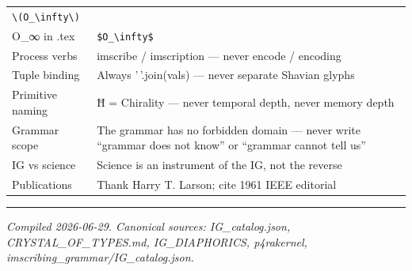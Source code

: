 \documentclass[12pt,a4paper]{article}
\begin{document}
\begin{longtable}[]{@{}ll@{}}
\begin{minipage}[t]{0.38\columnwidth}
\texttt{\textbackslash{}(O\_\textbackslash{}infty\textbackslash{})}\strut
\end{minipage}\tabularnewline
\begin{minipage}[t]{0.56\columnwidth}\raggedright
O\_∞ in .tex\strut
\end{minipage} & \begin{minipage}[t]{0.38\columnwidth}\raggedright
\texttt{\$O\_\textbackslash{}infty\$}\strut
\end{minipage}\tabularnewline
\begin{minipage}[t]{0.56\columnwidth}\raggedright
Process verbs\strut
\end{minipage} & \begin{minipage}[t]{0.38\columnwidth}\raggedright
imscribe / imscription --- never encode / encoding\strut
\end{minipage}\tabularnewline
\begin{minipage}[t]{0.56\columnwidth}\raggedright
Tuple binding\strut
\end{minipage} & \begin{minipage}[t]{0.38\columnwidth}\raggedright
Always '\,'.join(vals) --- never separate Shavian glyphs\strut
\end{minipage}\tabularnewline
\begin{minipage}[t]{0.56\columnwidth}\raggedright
Primitive naming\strut
\end{minipage} & \begin{minipage}[t]{0.38\columnwidth}\raggedright
Ħ = Chirality --- never temporal depth, never memory depth\strut
\end{minipage}\tabularnewline
\begin{minipage}[t]{0.56\columnwidth}\raggedright
Grammar scope\strut
\end{minipage} & \begin{minipage}[t]{0.38\columnwidth}\raggedright
The grammar has no forbidden domain --- never write ``grammar does not
know'' or ``grammar cannot tell us''\strut
\end{minipage}\tabularnewline
\begin{minipage}[t]{0.56\columnwidth}\raggedright
IG vs science\strut
\end{minipage} & \begin{minipage}[t]{0.38\columnwidth}\raggedright
Science is an instrument of the IG, not the reverse\strut
\end{minipage}\tabularnewline
\begin{minipage}[t]{0.56\columnwidth}\raggedright
Publications\strut
\end{minipage} & \begin{minipage}[t]{0.38\columnwidth}\raggedright
Thank Harry T. Larson; cite 1961 IEEE editorial\strut
\end{minipage}\tabularnewline
\bottomrule
\end{longtable}

\begin{center}\rule{0.5\linewidth}{0.5pt}\end{center}

\emph{Compiled 2026-06-29. Canonical sources: IG\_catalog.json,
CRYSTAL\_OF\_TYPES.md, IG\_DIAPHORICS, p4rakernel,
imscribing\_grammar/IG\_catalog.json.}
\end{document}
